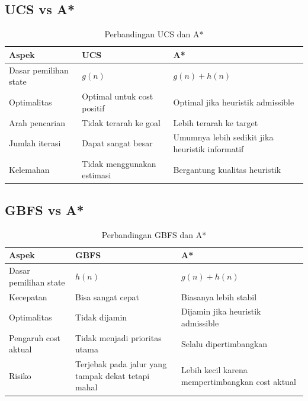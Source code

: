 \subsection{UCS vs A*}

\begin{table}[H]
	\centering
	\caption{Perbandingan UCS dan A*}
	\begin{tabular}{|p{4cm}|p{5cm}|p{5cm}|}
		\hline
		\rowcolor{gray!25}
		\textbf{Aspek} & \textbf{UCS} & \textbf{A*} \\
		\hline
		Dasar pemilihan state & $g(n)$ & $g(n)+h(n)$ \\
		\hline
		Optimalitas & Optimal untuk cost positif & Optimal jika heuristik admissible \\
		\hline
		Arah pencarian & Tidak terarah ke goal & Lebih terarah ke target \\
		\hline
		Jumlah iterasi & Dapat sangat besar & Umumnya lebih sedikit jika heuristik informatif \\
		\hline
		Kelemahan & Tidak menggunakan estimasi & Bergantung kualitas heuristik \\
		\hline
	\end{tabular}
\end{table}

\subsection{GBFS vs A*}

\begin{table}[H]
	\centering
	\caption{Perbandingan GBFS dan A*}
	\begin{tabular}{|p{4cm}|p{5cm}|p{5cm}|}
		\hline
		\rowcolor{gray!25}
		\textbf{Aspek} & \textbf{GBFS} & \textbf{A*} \\
		\hline
		Dasar pemilihan state & $h(n)$ & $g(n)+h(n)$ \\
		\hline
		Kecepatan & Bisa sangat cepat & Biasanya lebih stabil \\
		\hline
		Optimalitas & Tidak dijamin & Dijamin jika heuristik admissible \\
		\hline
		Pengaruh cost aktual & Tidak menjadi prioritas utama & Selalu dipertimbangkan \\
		\hline
		Risiko & Terjebak pada jalur yang tampak dekat tetapi mahal & Lebih kecil karena mempertimbangkan cost aktual \\
		\hline
	\end{tabular}
\end{table}

